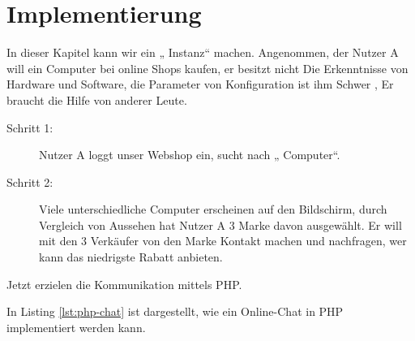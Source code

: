 
\chapter{Implementierung}

In dieser Kapitel kann wir ein „ Instanz“ machen. Angenommen, der Nutzer A will ein Computer bei online Shops kaufen, er besitzt nicht Die Erkenntnisse von Hardware und Software, die Parameter von Konfiguration ist ihm Schwer , Er braucht die Hilfe von anderer Leute.

\begin{description}
\item[Schritt 1:] Nutzer A loggt unser Webshop ein, sucht nach „ Computer“.

\item[Schritt 2:] Viele unterschiedliche Computer erscheinen auf den Bildschirm, durch Vergleich von Aussehen hat Nutzer A 3 Marke davon ausgewählt. Er will mit den 3 Verkäufer von den Marke Kontakt machen und nachfragen, wer kann das niedrigste Rabatt anbieten.
\end{description}

Jetzt erzielen die Kommunikation mittels PHP.

In Listing \vref{lst:php-chat} ist dargestellt, wie ein Online-Chat in PHP implementiert werden kann.


